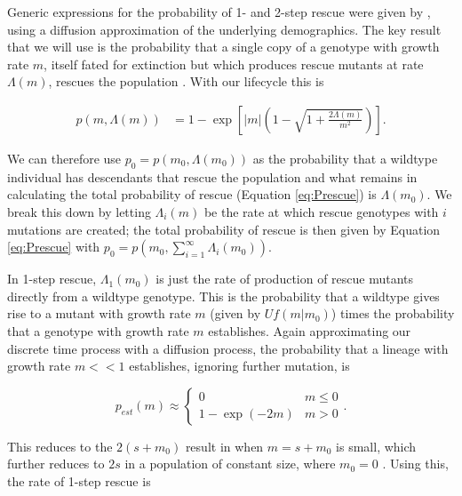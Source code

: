 \documentclass[9pt,twocolumn,twoside,lineno]{gsajnl}
\begin{document}
Generic expressions for the probability of 1- and 2-step rescue were given by \cite{Martin2013}, using a diffusion approximation of the underlying demographics.
The key result that we will use is the probability that a single copy of a genotype with growth rate $m$, itself fated for extinction but which produces rescue mutants at rate $\Lambda(m)$, rescues the population \citep[equation S1.5 in][]{Martin2013}.
With our lifecycle this is \citep[c.f., equation A.3 in][]{Iwasa2004}

\begin{equation}\label{eq:S15}
\begin{aligned}
p(m,\Lambda(m)) 
   &= 1 - \exp \left[  |m| \left(1 - \sqrt{1+\frac{2\Lambda(m)}{m^2}} \right) \right].
\end{aligned}
\end{equation}

\noindent We can therefore use $p_0 = p(m_0,\Lambda(m_0))$ as the probability that a wildtype individual has descendants that rescue the population and what remains in calculating the total probability of rescue (Equation \ref{eq:Prescue}) is $\Lambda(m_0)$.
We break this down by letting $\Lambda_i(m)$ be the rate at which rescue genotypes with $i$ mutations are created; the total probability of rescue is then given by Equation \ref{eq:Prescue} with $p_0=p(m_0, \sum_{i=1}^\infty\Lambda_i(m_0))$.

In 1-step rescue, $\Lambda_1(m_0)$ is just the rate of production of rescue mutants directly from a wildtype genotype.
This is the probability that a wildtype gives rise to a mutant with growth rate $m$ (given by $U f(m|m_0)$) times the probability that a genotype with growth rate $m$ establishes.
Again approximating our discrete time process with a diffusion process, the probability that a lineage with growth rate $m<<1$ establishes, ignoring further mutation, is \citep[e.g.,][]{Martin2013}

\begin{equation}\label{eq:pestm}
p_{est}(m) \approx
\begin{cases}
	0 & m \leq 0 \\
	1-\exp(-2 m) & m > 0
\end{cases}.
\end{equation}

\noindent This reduces to the $2(s+m_{0})$ result in \cite{Otto1997} when $m = s + m_{0}$ is small, which further reduces to $2s$ in a population of constant size, where $m_{0}=0$ \citep{Haldane1927}.
Using this, the rate of 1-step rescue is
\end{document}
